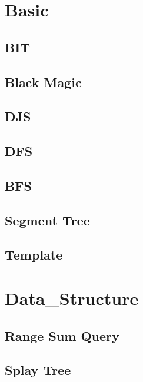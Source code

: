 \section{Basic}
    \subsection{BIT}
        
    \subsection{Black Magic}
        
    \subsection{DJS}
        
    \subsection{DFS}
        
    \subsection{BFS}
        
    \subsection{Segment Tree}
        
    \subsection{Template}
        

\section{Data_Structure}
    \subsection{Range Sum Query}
        
    \subsection{Splay Tree}
        

